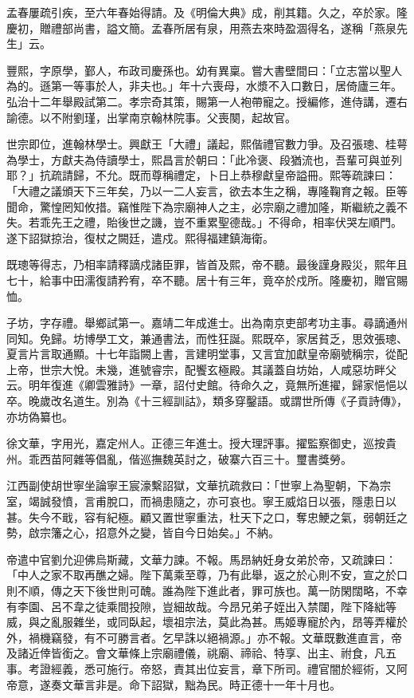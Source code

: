 \begin{pinyinscope}
孟春屢疏引疾，至六年春始得請。及《明倫大典》成，削其籍。久之，卒於家。隆慶初，贈禮部尚書，謚文簡。孟春所居有泉，用燕去來時盈涸得名，遂稱「燕泉先生」云。

豐熙，字原學，鄞人，布政司慶孫也。幼有異稟。嘗大書壁間曰：「立志當以聖人為的。遜第一等事於人，非夫也。」年十六喪母，水漿不入口數日，居倚廬三年。弘治十二年舉殿試第二。孝宗奇其策，賜第一人袍帶寵之。授編修，進侍講，遷右諭德。以不附劉瑾，出掌南京翰林院事。父喪闋，起故官。

世宗即位，進翰林學士。興獻王「大禮」議起，熙偕禮官數力爭。及召張璁、桂萼為學士，方獻夫為侍讀學士，熙昌言於朝曰：「此冷褒、段猶流也，吾輩可與並列耶？」抗疏請歸，不允。既而尊稱禮定，卜日上恭穆獻皇帝謚冊。熙等疏諫曰：「大禮之議頒天下三年矣，乃以一二人妄言，欲去本生之稱，專隆鞠育之報。臣等聞命，驚惶罔知攸措。竊惟陛下為宗廟神人之主，必宗廟之禮加隆，斯繼統之義不失。若乖先王之禮，貽後世之譏，豈不重累聖德哉。」不得命，相率伏哭左順門。遂下詔獄掠治，復杖之闕廷，遣戍。熙得福建鎮海衛。

既璁等得志，乃相率請釋謫戍諸臣罪，皆首及熙，帝不聽。最後謹身殿災，熙年且七十，給事中田濡復請矜宥，卒不聽。居十有三年，竟卒於戍所。隆慶初，贈官賜恤。

子坊，字存禮。舉鄉試第一。嘉靖二年成進士。出為南京吏部考功主事。尋謫通州同知。免歸。坊博學工文，兼通書法，而性狂誕。熙既卒，家居貧乏，思效張璁、夏言片言取通顯。十七年詣闕上書，言建明堂事，又言宜加獻皇帝廟號稱宗，從配上帝，世宗大悅。未幾，進號睿宗，配饗玄極殿。其議蓋自坊始，人咸惡坊畔父云。明年復進《卿雲雅詩》一章，詔付史館。待命久之，竟無所進擢，歸家悒悒以卒。晚歲改名道生。別為《十三經訓詁》，類多穿鑿語。或謂世所傳《子貢詩傳》，亦坊偽纂也。

徐文華，字用光，嘉定州人。正德三年進士。授大理評事。擢監察御史，巡按貴州。乖西苗阿雜等倡亂，偕巡撫魏英討之，破寨六百三十。璽書獎勞。

江西副使胡世寧坐論寧王宸濠繫詔獄，文華抗疏救曰：「世寧上為聖朝，下為宗室，竭誠發憤，言甫脫口，而禍患隨之，亦可哀也。寧王威焰日以張，隱患日以甚。失今不戢，容有紀極。顧又置世寧重法，杜天下之口，奪忠鯁之氣，弱朝廷之勢，啟宗籓之心，招意外之變，皆自今日始矣。」不納。

帝遣中官劉允迎佛烏斯藏，文華力諫。不報。馬昂納妊身女弟於帝，又疏諫曰：「中人之家不取再醮之婦。陛下萬乘至尊，乃有此舉，返之於心則不安，宣之於口則不順，傳之天下後世則可醜。誰為陛下進此者，罪可族也。萬一防閑闊略，不幸有李園、呂不韋之徒乘間投隙，豈細故哉。今昂兄弟子姪出入禁闥，陛下降絀等威，與之亂服雜坐，或同臥起，壞祖宗法，莫此為甚。馬姬專寵於內，昂等弄權於外，禍機竊發，有不可勝言者。乞早誅以絕禍源。」亦不報。文華既數進直言，帝及諸近倖皆銜之。會文華條上宗廟禮儀，祧廟、禘祫、特享、出主、祔食，凡五事。考證經義，悉可施行。帝怒，責其出位妄言，章下所司。禮官闇於經術，又阿帝意，遂奏文華言非是。命下詔獄，黜為民。時正德十一年十月也。


\end{pinyinscope}
